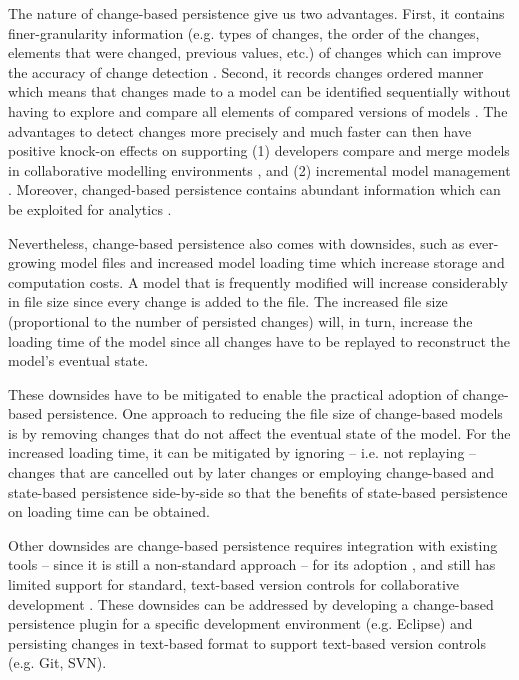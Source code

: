 The nature of change-based persistence give us two advantages. First, it contains finer-granularity information (e.g. types of changes, the order of the changes, elements that were changed, previous values, etc.) of changes which can improve the accuracy of change detection \cite{DBLP:journals/entcs/RobbesL07,DBLP:conf/sde/LippeO92,DBLP:conf/caise/IgnatN05,mens2002state}. Second, it records changes ordered manner which means that changes made to a model can be identified sequentially without having to explore and compare all elements of compared versions of models \cite{DBLP:conf/edoc/KoegelHLHD10}. The advantages to detect changes more precisely and much faster can then have positive knock-on effects on supporting (1) developers compare and merge models in collaborative modelling environments \cite{DBLP:conf/sde/LippeO92,DBLP:conf/caise/IgnatN05,koegel2010emfstore}, and (2) incremental model management \cite{jouault2010towards,DBLP:conf/ecmdafa/OgunyomiRK15, DBLP:conf/ecmdafa/RathHV12}. Moreover, changed-based persistence contains abundant information which can be exploited for analytics \cite{DBLP:journals/entcs/RobbesL07}.

Nevertheless, change-based persistence also comes with downsides, such as ever-growing model files 
\cite{DBLP:journals/entcs/RobbesL07,DBLP:conf/edoc/KoegelHLHD10} and increased model loading time \cite{mens2002state}
which increase storage and computation costs. A model that is frequently modified will increase considerably in file size 
since every change is added to the file. The increased file size (proportional to the number of persisted changes) will, 
in turn, increase the loading time of the model since all changes have to be replayed to reconstruct the model's 
eventual state. 

These downsides have to be mitigated to enable the practical adoption of change-based persistence. 
One approach to reducing the file size of change-based models is by removing changes that do not affect the eventual 
state of the model. For the increased loading time, it can be mitigated by ignoring -- i.e. not replaying -- changes 
that are cancelled out by later changes or employing change-based and state-based persistence side-by-side so that the
benefits of state-based persistence on loading time can be obtained. 

Other downsides are change-based persistence requires 
integration with existing tools -- since it is still a non-standard approach -- for its adoption \cite{koegel2010emfstore}, 
and still has limited support for standard, text-based version controls for collaborative development \cite{koegel2010emfstore}. 
These downsides can be addressed by developing a change-based persistence plugin for a specific development environment 
(e.g. Eclipse) and persisting changes in text-based format to support text-based version controls (e.g. Git, SVN).


